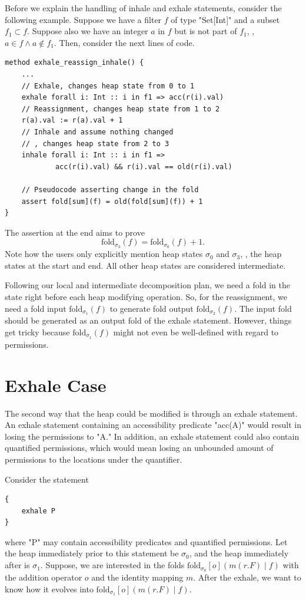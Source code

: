 \documentclass[msc,oneside]{ubcthesis}
\begin{document}
Before we explain the handling of inhale and exhale statements, consider the following example. Suppose we have a filter $f$ of type "Set[Int]" and a subset $f_1 \subset f$. Suppose also we have an integer $a$ in $f$ but is not part of $f_1$, \ie, $a \in f \land a \not\in f_1$. Then, consider the next lines of code.
\begin{lstlisting}
method exhale_reassign_inhale() {
    ...
    // Exhale, changes heap state from 0 to 1
    exhale forall i: Int :: i in f1 => acc(r(i).val)
    // Reassignment, changes heap state from 1 to 2
    r(a).val := r(a).val + 1
    // Inhale and assume nothing changed
    // , changes heap state from 2 to 3
    inhale forall i: Int :: i in f1 => 
            acc(r(i).val) && r(i).val == old(r(i).val)

    // Pseudocode asserting change in the fold
    assert fold[sum](f) = old(fold[sum](f)) + 1 
}
\end{lstlisting}
The assertion at the end aims to prove 
$$\textrm{fold}_{\sigma_{3}}(f) = \textrm{fold}_{\sigma_{0}}(f) + 1.$$ Note how the users only explicitly mention heap states $\sigma_{0}$ and $\sigma_{3}$, \ie, the heap states at the start and end. All other heap states are considered intermediate.

Following our local and intermediate decomposition plan, we need a fold in the state right before each heap modifying operation. So, for the reassignment, we need a fold input $\textrm{fold}_{\sigma_{1}}(f)$ to generate fold output $\textrm{fold}_{\sigma_{2}}(f)$. The input fold should be generated as an output fold of the exhale statement. However, things get tricky because $\textrm{fold}_{\sigma_{1}}(f)$ might not even be well-defined with regard to permissions. 

\section{Exhale Case}
The second way that the heap could be modified is through an exhale statement. An exhale statement containing an accessibility predicate "acc(A)" would result in losing the permissions to "A." In addition, an exhale statement could also contain quantified permissions, which would mean losing an unbounded amount of permissions to the locations under the quantifier. 

Consider the statement 
\begin{lstlisting}
{
    exhale P
}
\end{lstlisting}
where "P" may contain accessibility predicates and quantified permissions. Let the heap immediately prior to this statement be $\sigma_0$, and the heap immediately after is $\sigma_1$. Suppose, we are interested in the folds $\textrm{fold}_{\sigma_0}[o]( m(r.F) \mid f)$ with the addition operator $o$ and the identity mapping $m$. After the exhale, we want to know how it evolves into $\textrm{fold}_{\sigma_1}[o]( m(r.F) \mid f)$.
\end{document}
